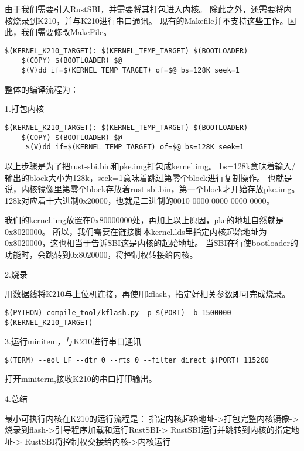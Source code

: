 由于我们需要引入RustSBI，并需要将其打包进入内核。
除此之外，还需要将内核烧录到K210，并与K210进行串口通讯。
现有的Makefile并不支持这些工作。因此，我们需要修改MakeFile。

\begin{lstlisting}[caption={修改Makefile}, label={lst:change_makefile}]
    $(KERNEL_K210_TARGET): $(KERNEL_TEMP_TARGET) $(BOOTLOADER)
    $(COPY) $(BOOTLOADER) $@
    $(V)dd if=$(KERNEL_TEMP_TARGET) of=$@ bs=128K seek=1
\end{lstlisting}

整体的编译流程为：

1.打包内核

\begin{lstlisting}[caption={打包内核}, label={lst:pack_kernel}]
    $(KERNEL_K210_TARGET): $(KERNEL_TEMP_TARGET) $(BOOTLOADER)
    $(COPY) $(BOOTLOADER) $@
     $(V)dd if=$(KERNEL_TEMP_TARGET) of=$@ bs=128K seek=1
\end{lstlisting}


以上步骤是为了把rust-sbi.bin和pke.img打包成kernel.img。
bs=128k意味着输入/输出的block大小为128k，seek=1意味着跳过第零个block进行复制操作。
也就是说，内核镜像里第零个block存放着rust-sbi.bin，第一个block才开始存放pke.img。
128k对应着十六进制0x20000，也就是二进制的0010 0000 0000 0000 0000。

我们的kernel.img放置在0x80000000处，再加上以上原因，pke的地址自然就是0x8020000。
所以，我们需要在链接脚本kernel.lds里指定内核起始地址为0x8020000，这也相当于告诉SBI这是内核的起始地址。
当SBI在行使bootloader的功能时，会跳转到0x8020000，将控制权转接给内核。

2.烧录

用数据线将K210与上位机连接，再使用kflash，指定好相关参数即可完成烧录。

\begin{lstlisting}[caption={烧录}, label={lst:burn}]
    $(PYTHON) compile_tool/kflash.py -p $(PORT) -b 1500000 $(KERNEL_K210_TARGET)
\end{lstlisting}

3.运行minitem，与K210进行串口通讯

\begin{lstlisting}[caption={运行minitem}, label={lst:run_minitem}]
    $(TERM) --eol LF --dtr 0 --rts 0 --filter direct $(PORT) 115200
\end{lstlisting}

打开miniterm,接收K210的串口打印输出。

4.总结

最小可执行内核在K210的运行流程是：
指定内核起始地址->打包完整内核镜像->
烧录到flash->引导程序加载和运行RustSBI->
RustSBI运行并跳转到内核的指定地址->
RustSBI将控制权交接给内核->内核运行

